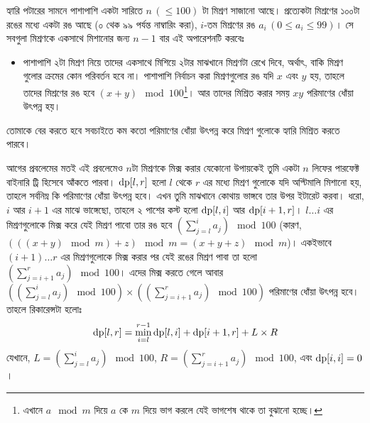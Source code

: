 \begin{example}
  হ্যারি পটারের সামনে পাশাপাশি একটা সারিতে $n \, (\le 100)$ টা মিশ্রণ সাজানো
  আছে। প্রত্যেকটা মিশ্রণের ১০০টা রঙের মধ্যে একটা রঙ আছে (০ থেক ৯৯ পর্যন্ত
  নাম্বারিং করা), $i$-তম মিশ্রণের রঙ $a_i \, (0 \le a_i \le 99)$। সে সবগুলা
  মিশ্রণকে একসাথে মিশানোর জন্য $n-1$ বার এই অপারেশনটি করবেঃ
  \begin{itemize}
    \item পাশাপাশি ২টা মিশ্রণ নিয়ে তাদের একসাথে মিশিয়ে ২টার মাঝখানে মিশ্রণটা
    রেখে দিবে, অর্থাৎ, বাকি মিশ্রণ গুলোর ক্রমের কোন পরিবর্তন হবে না। পাশাপাশি
    নির্বাচন করা মিশ্রণগুলোর রঙ যদি $x$ এবং $y$ হয়, তাহলে তাদের মিশ্রণের রঙ
    হবে $(x+y) \mod 100$\footnote{এখানে $a \mod m$ দিয়ে $a$ কে $m$ দিয়ে ভাগ
    করলে যেই ভাগশেষ থাকে তা বুঝানো হচ্ছে।}। আর তাদের মিশ্রিত করার সময় $xy$
    পরিমাণের ধোঁয়া উৎপন্ন হয়।
  \end{itemize}
  তোমাকে বের করতে হবে সবচাইতে কম কতো পরিমাণের ধোঁয়া উৎপন্ন করে মিশ্রণ গুলোকে
  হ্যারি মিশ্রিত করতে পারবে।
\end{example}

\begin{solution}
  আগের প্রবলেমের মতই এই প্রবলেমেও $n$টা মিশ্রণকে মিক্স করার যেকোনো উপায়কেই
  তুমি একটা $n$ লিফের পারফেক্ট বাইনারি ট্রি হিসেবে আঁকতে পারবা।
  $\text{dp}[l, r]$ হলো $l$ থেকে $r$ এর মধ্যে মিশ্রণ গুলোকে যদি অপ্টিমালি
  মিশানো হয়, তাহলে সর্বনিম্ন কি পরিমাণের ধোঁয়া উৎপন্ন হবে। এখন তুমি মাঝখানে
  কোথায় ভাঙ্গবে তার উপর ইটারেট করবা। ধরো, $i$ আর $i+1$ এর মাঝে ভাঙ্গেছো,
  তাহলে ২ পাশের কস্ট হলো $\text{dp}[l, i]$ আর $\text{dp}[i+1, r]$। $l \ldots i$
  এর মিশ্রণগুলোকে মিক্স করে যেই মিশ্রণ পাবো তার রঙ হবে $\left(\sum_{j=l}^{i}
  a_j \right) \mod 100$ (কারণ, $(((x+y)\mod m) + z) \mod m = (x+y+z) \mod
  m$)। একইভাবে $(i+1) \ldots r$ এর মিশ্রণগুলোকে মিক্স করার পর যেই রঙের মিশ্রণ
  পাবা তা হলো $\left(\sum_{j=i+1}^{r} a_j \right) \mod 100$। এদের মিক্স করতে
  গেলে আবার $\left( \left(\sum_{j=l}^{i} a_j \right) \mod 100 \right) \times
  \left( \left( \sum_{j=i+1}^{r} a_j \right) \mod 100 \right)$ পরিমাণের ধোঁয়া
  উৎপন্ন হবে। তাহলে রিকারেন্সটা হলোঃ
  \[
    \text{dp}[l, r] = \min_{i=l}^{r-1} \text{dp}[l, i] + \text{dp}[i+1, r] + L
    \times R
  \]
  যেখানে, $L = \left(\sum_{j=l}^{i} a_j \right) \mod 100$, $R = \left(
  \sum_{j=i+1}^{r} a_j \right) \mod 100$, এবং $\text{dp}[i, i] = 0$।
\end{solution}

